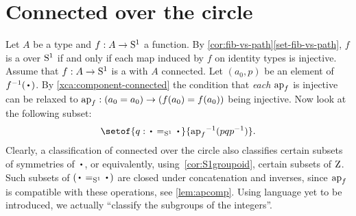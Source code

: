 \section{Connected \coverings over the circle}
\label{sec:covS1}

Let $A$ be a type and $f:A\to {\mathrm{S}^1}$ a function.
By \cref{cor:fib-vs-path}\ref{set-fib-vs-path}, $f$ is a \covering
over ${\mathrm{S}^1}$ if and only if each map induced by $f$ on identity types is injective.
Assume that $f:A\to {\mathrm{S}^1}$ is a \covering with $A$ connected.
Let $(a_0,p)$ be an element of $f^{-1}(\base)$.
By \cref{xca:component-connected}
the condition that \emph{each} $\ap{f}$ is injective
can be relaxed to $\ap{f}: (a_0=a_0)\to(f(a_0)=f(a_0))$ being injective.
Now look at the following subset:
\begin{equation}\label{eq:subgroup-covering-1}
  \setof{q: \base =_\Sc \base}{{\ap{f}}^{-1}(pqp^{-1})}.
\end{equation}
Clearly, a classification of connected \coverings over the circle
also classifies certain subsets of symmetries of $\base$,
or equivalently, using~\cref{cor:S1groupoid}, certain subsets of $\mathrm{Z}$.
Such subsets of $(\base=_\Sc\base)$ are closed under concatenation and inverses,
since $\ap{f}$ is compatible with these operations,
see \cref{lem:apcomp}.
Using language yet to be introduced, we actually ``classify the subgroups of the integers''.

